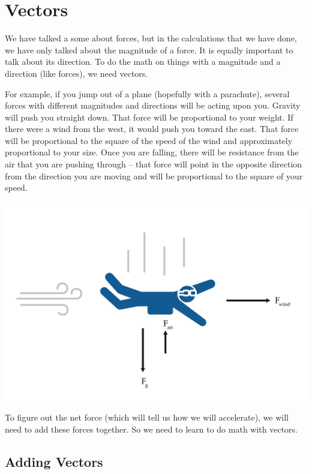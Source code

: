 \chapter{Vectors}

We have talked a some about forces, but in the calculations that we
have done, we have only talked about the magnitude of a force. It is
equally important to talk about its direction. To do the math on
things with a magnitude and a direction (like forces), we need vectors.

For example, if you jump out of a plane (hopefully with a parachute), 
several forces with different magnitudes and directions will be acting upon 
you. Gravity will push you straight down. That force will be proportional to your weight.
If there were a wind from the west, it would push you toward the east. That force
will be proportional to the square of the speed of the wind and approximately proportional to 
your size. Once you are falling, there will be resistance from the air 
that you are pushing through -- that force will point in the opposite direction
from the direction you are moving and will be proportional to the square of your
speed.

\includegraphics[width=1\textwidth]{skydiver.png}


To figure out the net force (which will tell us how we will accelerate), we will 
need to add these forces together. So we need to learn to do math with vectors.

\section{Adding Vectors}

